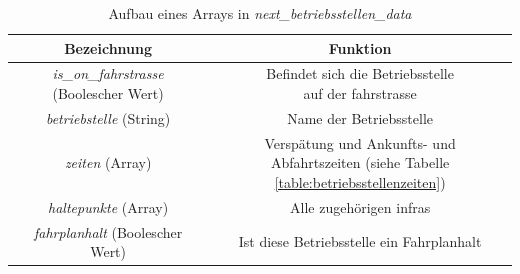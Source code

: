 \begin{table}
\begin{center}
\renewcommand{\arraystretch}{1.2}
\begin{tabular}{c|c}
Bezeichnung & Funktion \\ \hline
\textit{is\_on\_fahrstrasse} (Boolescher Wert)                  		&    \makecell{Befindet sich die Betriebsstelle\\auf der \Gls{fahrstrasse}}                  \\ \hline
\textit{betriebstelle} (String)                  		&    Name der Betriebsstelle                  \\ \hline
\textit{zeiten} (Array)                  		&    \makecell{Verspätung und Ankunfts- und\\Abfahrtszeiten (siehe Tabelle \ref{table:betriebsstellenzeiten})}                  \\ \hline
\textit{haltepunkte} (Array)                  		&    Alle zugehörigen \acp{infra}                 \\ \hline
\textit{fahrplanhalt} (Boolescher Wert)             	&    Ist diese Betriebsstelle ein Fahrplanhalt               \\ 
\end{tabular}
\renewcommand{\arraystretch}{1}
\caption{Aufbau eines Arrays in \textit{next\_betriebsstellen\_data}}
\label{table:betriebsstellen}
\end{center}
\end{table}

